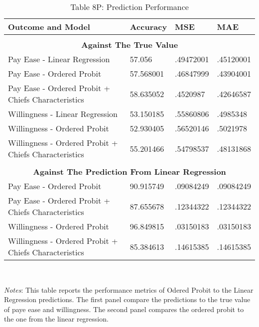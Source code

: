 \begin{table}[H]
\caption*{Table 8P: Prediction Performance}
\centering
\centerfloat
\begin{tabular}{|l|l|l|l|}\hline  
 \textbf{Outcome and Model}& \textbf{Accuracy}  & \textbf{MSE}  & \textbf{MAE}  \\ \hline  
 \multicolumn{4}{c}{ } \\
 \multicolumn{4}{c}{\textbf{Against The True Value}} \\\hline
Pay Ease - Linear Regression & 57.056 & .49472001 & .45120001 \\ \hline 
Pay Ease - Ordered Probit & 57.568001 & .46847999 & .43904001 \\ \hline 
Pay Ease - Ordered Probit + Chiefs Characteristics  & 58.635052 & .4520987 & .42646587 \\ \hline 
Willingness - Linear Regression & 53.150185 & .55860806 & .4985348 \\ \hline 
Willingness - Ordered Probit & 52.930405 & .56520146 & .5021978 \\ \hline 
Willingness - Ordered Probit + Chiefs Characteristics   & 55.201466 & .54798537 & .48131868 \\ \hline

 \multicolumn{4}{c}{ } \\
 \multicolumn{4}{c}{\textbf{Against The Prediction From Linear Regression }} \\\hline
Pay Ease - Ordered Probit  & 90.915749 & .09084249 & .09084249 \\ \hline 
Pay Ease - Ordered Probit + Chiefs Characteristics & 87.655678 & .12344322 & .12344322 \\ \hline 
Willingness - Ordered Probit & 96.849815 & .03150183 & .03150183 \\ \hline 
Willingness - Ordered Probit + Chiefs Characteristics & 85.384613 & .14615385 & .14615385 \\ \hline 
  \end{tabular}
\usebox{\tablebox}\\[1ex]
\parbox{6in}{\small \textit{Notes}: This table reports the performance metrics of Odered Probit to the Linear Regression predictions. The first panel compare the predictions to the true value of paye ease and willingness. The second panel compares the ordered probit to the one from the linear regression.}
\end{table}
